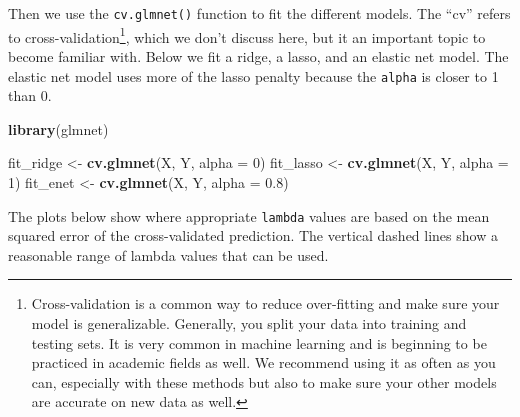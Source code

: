 \documentclass[]{tufte-book}
\newenvironment{Shaded}{}{}
\newcommand{\KeywordTok}[1]{\textcolor[rgb]{0.00,0.44,0.13}{\textbf{#1}}}
\newcommand{\DataTypeTok}[1]{\textcolor[rgb]{0.56,0.13,0.00}{#1}}
\newcommand{\DecValTok}[1]{\textcolor[rgb]{0.25,0.63,0.44}{#1}}
\newcommand{\FloatTok}[1]{\textcolor[rgb]{0.25,0.63,0.44}{#1}}
\newcommand{\StringTok}[1]{\textcolor[rgb]{0.25,0.44,0.63}{#1}}
\newcommand{\OperatorTok}[1]{\textcolor[rgb]{0.40,0.40,0.40}{#1}}
\newcommand{\NormalTok}[1]{#1}
\theoremstyle{definition}
\theoremstyle{definition}
\theoremstyle{remark}
\begin{document}
\begin{Shaded}
\end{Shaded}

Then we use the \texttt{cv.glmnet()} function to fit the different
models. The ``cv'' refers to cross-validation\footnote{Cross-validation
  is a common way to reduce over-fitting and make sure your model is
  generalizable. Generally, you split your data into training and
  testing sets. It is very common in machine learning and is beginning
  to be practiced in academic fields as well. We recommend using it as
  often as you can, especially with these methods but also to make sure
  your other models are accurate on new data as well.}, which we don't
discuss here, but it an important topic to become familiar with. Below
we fit a ridge, a lasso, and an elastic net model. The elastic net model
uses more of the lasso penalty because the \texttt{alpha} is closer to 1
than 0.

\begin{Shaded}
\begin{Highlighting}[]
\KeywordTok{library}\NormalTok{(glmnet)}

\NormalTok{fit_ridge <-}\StringTok{ }\KeywordTok{cv.glmnet}\NormalTok{(X, Y, }\DataTypeTok{alpha =} \DecValTok{0}\NormalTok{)}
\NormalTok{fit_lasso <-}\StringTok{ }\KeywordTok{cv.glmnet}\NormalTok{(X, Y, }\DataTypeTok{alpha =} \DecValTok{1}\NormalTok{)}
\NormalTok{fit_enet <-}\StringTok{ }\KeywordTok{cv.glmnet}\NormalTok{(X, Y, }\DataTypeTok{alpha =} \FloatTok{0.8}\NormalTok{)}
\end{Highlighting}
\end{Shaded}

The plots below show where appropriate \texttt{lambda} values are based
on the mean squared error of the cross-validated prediction. The
vertical dashed lines show a reasonable range of lambda values that can
be used.
\end{document}
